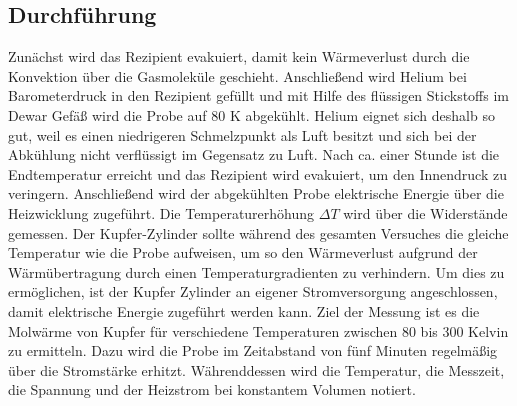 \documentclass{article}
\begin{document}
\subsection{Durchführung}
Zunächst wird das Rezipient evakuiert, damit kein Wärmeverlust durch die Konvektion über die Gasmoleküle geschieht. Anschließend wird Helium bei Barometerdruck in den Rezipient gefüllt und mit Hilfe des flüssigen Stickstoffs im Dewar Gefäß wird die Probe auf 80 K abgekühlt. Helium eignet sich deshalb so gut, weil es einen niedrigeren Schmelzpunkt als Luft besitzt und sich bei der Abkühlung nicht verflüssigt im Gegensatz zu Luft. Nach ca. einer Stunde ist die Endtemperatur erreicht und das Rezipient wird evakuiert, um den Innendruck zu veringern. Anschließend wird der abgekühlten Probe elektrische Energie über die Heizwicklung zugeführt. Die Temperaturerhöhung $\Delta T$ wird über die Widerstände gemessen. Der Kupfer-Zylinder sollte während des gesamten Versuches die gleiche Temperatur wie die Probe aufweisen, um so den Wärmeverlust aufgrund der Wärmübertragung durch einen Temperaturgradienten zu verhindern. Um dies zu ermöglichen, ist der Kupfer Zylinder an eigener Stromversorgung angeschlossen, damit elektrische Energie zugeführt werden kann. Ziel der Messung ist es die Molwärme von Kupfer für verschiedene Temperaturen zwischen 80 bis 300 Kelvin zu ermitteln. Dazu wird die Probe im Zeitabstand von fünf Minuten regelmäßig über die Stromstärke erhitzt. Währenddessen wird die Temperatur, die Messzeit, die Spannung und der Heizstrom bei konstantem Volumen notiert. 
\end{document}
